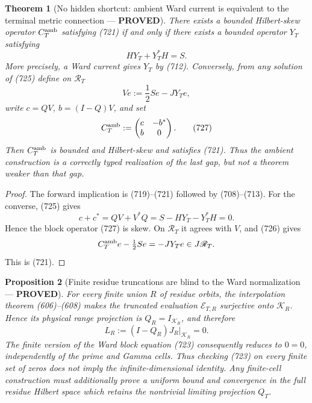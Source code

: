 \documentclass[11pt]{article}
\newtheorem{theorem}{Theorem}
\newtheorem{proposition}[theorem]{Proposition}
\newcommand{\PROVED}{\textcolor{green!45!black}{\textbf{PROVED}}}
\begin{document}
\begin{theorem}[No hidden shortcut: ambient Ward current is equivalent to
the terminal metric connection --- \PROVED]
There exists a bounded Hilbert-skew operator \(C_T^{\rm amb}\) satisfying
(721) if and only if there exists a bounded operator \(Y_T\) satisfying
\begin{equation}
 HY_T+Y_T^*H=S.                                    \tag{725}
\end{equation}
More precisely, a Ward current gives \(Y_T\) by (712).  Conversely, from
any solution of (725) define on \(\mathscr R_T\)
\begin{equation}
 Ve:=\frac12Se-JY_Te,                               \tag{726}
\end{equation}
write \(c=QV\), \(b=(I-Q)V\), and set
\begin{equation}
 C_T^{\rm amb}:=
 \begin{pmatrix}c&-b^*\\b&0\end{pmatrix}.          \tag{727}
\end{equation}
Then \(C_T^{\rm amb}\) is bounded and Hilbert-skew and satisfies (721).
Thus the ambient construction is a correctly typed realization of the
last gap, but not a theorem weaker than that gap.
\end{theorem}

\begin{proof}
The forward implication is (719)--(721) followed by (708)--(713).  For the
converse, (725) gives
\[
 c+c^*=QV+V^*Q=S-HY_T-Y_T^*H=0.
\]
Hence the block operator (727) is skew.  On \(\mathscr R_T\) it agrees
with \(V\), and (726) gives
\[
 C_T^{\rm amb}e-\tfrac12Se=-JY_Te\in J\mathscr R_T.
\]
This is (721).
\end{proof}

\begin{proposition}[Finite residue truncations are blind to the Ward
normalization --- \PROVED]
For every finite union \(R\) of residue orbits, the interpolation theorem
(606)--(608) makes the truncated evaluation
\(\mathcal E_{T,R}\) surjective onto \(\mathscr K_R\).  Hence its physical
range projection is \(Q_R=I_{\mathscr K_R}\), and therefore
\begin{equation}
 L_R:=(I-Q_R)J_R|_{\mathscr K_R}=0.                 \tag{728}
\end{equation}
The finite version of the Ward block equation (723) consequently reduces
to \(0=0\), independently of the prime and Gamma cells.  Thus checking
(723) on every finite set of zeros does not imply the infinite-dimensional
identity.  Any finite-cell construction must additionally prove a uniform
bound and convergence in the full residue Hilbert space which retains the
nontrivial limiting projection \(Q_T\).
\end{proposition}
\end{document}
